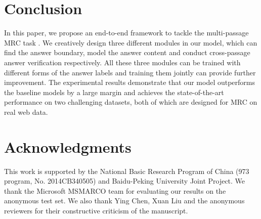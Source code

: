\documentclass[11pt,a4paper]{article}
\begin{document}
 
 
\section{Conclusion}
\label{conclusion}

In this paper, we propose an end-to-end framework to tackle the multi-passage MRC task . We creatively design three different modules in our model, which can find the answer boundary, model the answer content and conduct cross-passage answer verification respectively. All these three modules can be trained with different forms of the answer labels and training them jointly can provide further improvement. The experimental results demonstrate that our model outperforms the baseline models by a large margin and achieves the state-of-the-art performance on two challenging datasets, both of which are designed for MRC on real web data.
%
 
\section*{Acknowledgments}
This work is supported by the National Basic Research Program of China (973 program, No. 2014CB340505) and Baidu-Peking University Joint Project.
We thank the Microsoft MSMARCO team for evaluating our results on the anonymous test set. We also thank Ying Chen, Xuan Liu and the anonymous reviewers for their constructive criticism of the manuscript.




\end{document}
